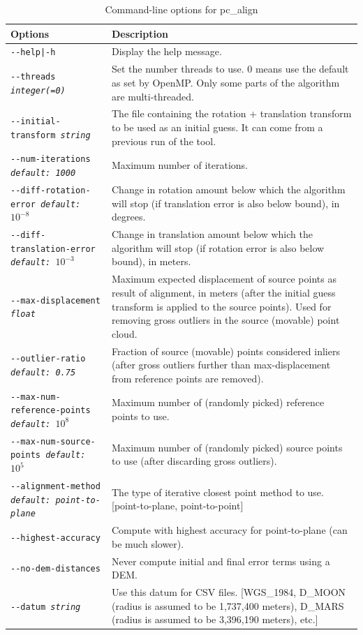 \begin{longtable}{|p{8cm}|p{9cm}|}
\caption{Command-line options for pc\_align}
\label{tbl:pcalign}
\endfirsthead
\endhead
\endfoot
\endlastfoot
\hline
Options & Description \\ \hline \hline
\texttt{-\/-help|-h} & Display the help message.\\ \hline
\texttt{-\/-threads \textit{integer(=0)}} & Set the number threads to
use. 0 means use the default as set by OpenMP. Only some parts of the algorithm are multi-threaded.\\ \hline
\texttt{-\/-initial-transform \textit{string}} &
The file containing the rotation + translation transform to be used as an
initial guess. It can come from a previous run of the tool. \\ \hline
\texttt{-\/-num-iterations \textit{default: 1000}} &  Maximum number of iterations. \\ \hline
\texttt{-\/-diff-rotation-error \textit{default: $10^{-8}$}} & Change in rotation amount below which the algorithm will stop (if translation error is also below bound), in degrees. \\ \hline
\texttt{-\/-diff-translation-error \textit{default: $10^{-3}$}} & Change in translation amount below which the algorithm will stop (if rotation error is also below bound), in meters. \\ \hline
\texttt{-\/-max-displacement \textit{float}} & Maximum expected
displacement of source points as result of alignment, in meters (after
the initial guess transform is applied to the source points). Used
for removing gross outliers in the source (movable) point cloud.\\ \hline
\texttt{-\/-outlier-ratio \textit{default: 0.75}} &  Fraction of source (movable) points considered inliers (after gross outliers further than max-displacement from reference points are removed). \\ \hline
\texttt{-\/-max-num-reference-points \textit{default: $10^8$}} &
Maximum number of (randomly picked) reference points to use. \\ \hline
\texttt{-\/-max-num-source-points \textit{default: $10^5$}} & Maximum number of (randomly picked) source points to use (after discarding gross outliers). \\ \hline
\texttt{-\/-alignment-method \textit{default: point-to-plane}} & The type of iterative closest point
method to use. [point-to-plane, point-to-point]\\ \hline
\texttt{-\/-highest-accuracy} & Compute with highest accuracy for point-to-plane (can be much slower). \\ \hline
\texttt{-\/-no-dem-distances} & Never compute initial and final error terms using a DEM. \\ \hline
\texttt{-\/-datum \textit{string}} & Use this datum for CSV files. [WGS\_1984, D\_MOON (radius is assumed to be 1,737,400 meters), D\_MARS (radius is assumed to be 3,396,190 meters), etc.] \\ \hline



\end{longtable}

